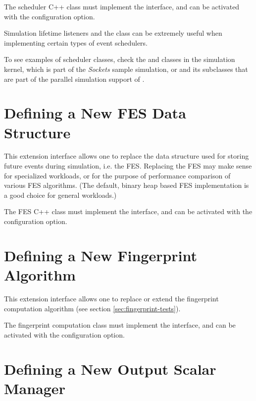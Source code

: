 The scheduler C++ class must implement the  interface,
and can be activated with the  configuration option.

Simulation lifetime listeners and the  class can be extremely
useful when implementing certain types of event schedulers.

To see examples of scheduler classes, check the
 and  classes in
the simulation kernel,  which is part of the
\textit{Sockets} sample simulation, or  and its
subclasses that are part of the parallel simulation support of {\opp}.


\section{Defining a New FES Data Structure}
\label{sec:plugin-exts:fes}

This extension interface allows one to replace the data structure used for
storing future events during simulation, i.e. the FES. Replacing the FES
may make sense for specialized workloads, or for the purpose of performance
comparison of various FES algorithms. (The default, binary heap based FES
implementation is a good choice for general workloads.)

The FES C++ class must implement the  interface,
and can be activated with the  configuration option.


\section{Defining a New Fingerprint Algorithm}
\label{sec:plugin-exts:fingerprint}

This extension interface allows one to replace or extend the fingerprint
computation algorithm (see section \ref{sec:fingerprint-tests}).


The fingerprint computation class must implement the  interface,
and can be activated with the  configuration option.


\section{Defining a New Output Scalar Manager}
\label{sec:plugin-exts:outputscalarmanager}


